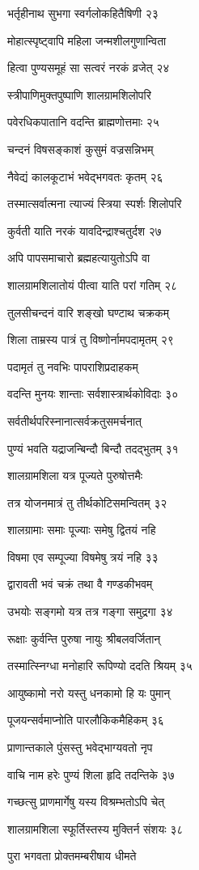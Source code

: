 भर्तृहीनाथ सुभगा स्वर्गलोकहितैषिणी २३

मोहात्स्पृष्ट्वापि महिला जन्मशीलगुणान्विता

हित्वा पुण्यसमूहं सा सत्वरं नरकं व्रजेत् २४

स्त्रीपाणिमुक्तपुष्पाणि शालग्रामशिलोपरि

पवेरधिकपातानि वदन्ति ब्राह्मणोत्तमाः २५

चन्दनं विषसङ्काशं कुसुमं वज्रसन्निभम्

नैवेद्यं कालकूटाभं भवेद्भगवतः कृतम् २६

तस्मात्सर्वात्मना त्याज्यं स्त्रिया स्पर्शः शिलोपरि

कुर्वती याति नरकं यावदिन्द्राश्चतुर्दश २७

अपि पापसमाचारो ब्रह्महत्यायुतोऽपि वा

शालग्रामशिलातोयं पीत्वा याति परां गतिम् २८

तुलसीचन्दनं वारि शङ्खो घण्टाथ चक्रकम्

शिला ताम्रस्य पात्रं तु विष्णोर्नामपदामृतम् २९

पदामृतं तु नवभिः पापराशिप्रदाहकम्

वदन्ति मुनयः शान्ताः सर्वशास्त्रार्थकोविदाः ३०

सर्वतीर्थपरिस्नानात्सर्वक्रतुसमर्चनात्

पुण्यं भवति यद्राजन्बिन्दौ बिन्दौ तदद्भुतम् ३१

शालग्रामशिला यत्र पूज्यते पुरुषोत्तमैः

तत्र योजनमात्रं तु तीर्थकोटिसमन्वितम् ३२

शालग्रामाः समाः पूज्याः समेषु द्वितयं नहि

विषमा एव सम्पूज्या विषमेषु त्रयं नहि ३३

द्वारावती भवं चक्रं तथा वै गण्डकीभवम्

उभयोः सङ्गमो यत्र तत्र गङ्गा समुद्रगा ३४

रूक्षाः कुर्वन्ति पुरुषा नायुः श्रीबलवर्जितान्

तस्मात्स्निग्धा मनोहारि रूपिण्यो ददति श्रियम् ३५

आयुष्कामो नरो यस्तु धनकामो हि यः पुमान्

पूजयन्सर्वमाप्नोति पारलौकिकमैहिकम् ३६

प्राणान्तकाले पुंसस्तु भवेद्भाग्यवतो नृप

वाचि नाम हरेः पुण्यं शिला हृदि तदन्तिके ३७

गच्छत्सु प्राणमार्गेषु यस्य विश्रम्भतोऽपि चेत्

शालग्रामशिला स्फूर्तिस्तस्य मुक्तिर्न संशयः ३८

पुरा भगवता प्रोक्तमम्बरीषाय धीमते

